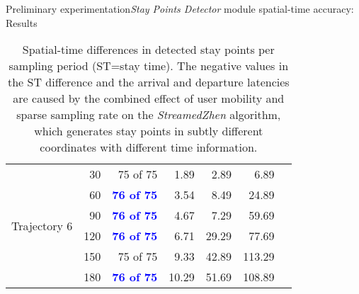 \begin{frame}{Preliminary experimentation}{\emph{Stay Points Detector} module spatial-time accuracy: Results}
\begin{table}
{\begin{tabular}{@{}lrrrrrr@{}}
\multirow{6}{*}{Trajectory 6} 
 & 30 & 75 of 75 & 1.89 & 2.89 & 6.89 \\
 & 60 & \textcolor{blue}{\textbf{76 of 75}} & 3.54 & 8.49 & 24.89 \\
 & 90 & \textcolor{blue}{\textbf{76 of 75}} & 4.67  & 7.29 & 59.69 \\
 & 120 & \textcolor{blue}{\textbf{76 of 75}} & 6.71 & 29.29 & 77.69 \\
 & 150 & 75 of 75 & 9.33 & 42.89 & 113.29 \\
 & 180 & \textcolor{blue}{\textbf{76 of 75}} & 10.29 & 51.69 & 108.89 \\
 \bottomrule 
\end{tabular}
}
\caption{Spatial-time differences in detected stay points per sampling period (ST=stay time). The negative values in the ST difference and the arrival and departure latencies are caused by the combined effect of user mobility and sparse sampling rate on the \emph{StreamedZhen} algorithm, which generates stay points in subtly different coordinates with different time information.}
\end{table}
\end{frame}



